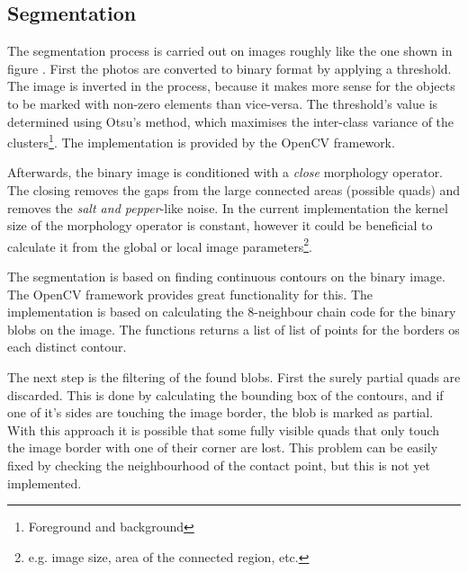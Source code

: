 \subsection{Segmentation}

The segmentation process is carried out on images roughly like the one shown in figure .
First the photos are converted to binary format by applying a threshold.
The image is inverted in the process, because it makes more sense for the objects to be marked with non-zero elements than vice-versa.
The threshold's value is determined using Otsu's method, which maximises the inter-class variance of the clusters\footnote{Foreground and background}.
The implementation is provided by the OpenCV framework.

Afterwards, the binary image is conditioned with a \emph{close} morphology operator.
The closing removes the gaps from the large connected areas (possible quads) and removes the \emph{salt and pepper}-like noise.
In the current implementation the kernel size of the morphology operator is constant, however it could be beneficial to calculate it from the global or local image parameters\footnote{e.g. image size, area of the connected region, etc.}.

The segmentation is based on finding continuous contours on the binary image.
The OpenCV framework provides great functionality for this.
The implementation is based on calculating the 8-neighbour chain code for the binary blobs on the image.
The functions returns a list of list of points for the borders os each distinct contour.

The next step is the filtering of the found blobs.
First the surely partial quads are discarded.
This is done by calculating the bounding box of the contours, and if one of it's sides are touching the image border, the blob is marked as partial.
With this approach it is possible that some fully visible quads that only touch the image border with one of their corner are lost.
This problem can be easily fixed by checking the neighbourhood of the contact point, but this is not yet implemented.

